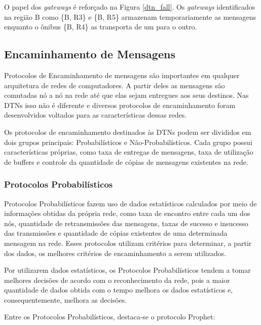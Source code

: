 O papel dos \emph{gateways} é reforçado na Figura \ref{dtn_fall}. Os \emph{gateways} identificados na região B como \{B, R3\} e \{B, R5\} armazenam temporariamente as mensagens enquanto o ônibus \{B, R4\} as transporta de um para o outro.

\subsection{Encaminhamento de Mensagens}
\label{subsec:encaminhamento_mensagens}
Protocolos de Encaminhamento de mensagens são importantes em qualquer arquitetura de redes de computadores. A partir deles as mensagens são comutadas nó a nó na rede até que elas sejam entregues aos seus destinos. Nas DTNs isso não é diferente e diversos protocolos de encaminhamento foram desenvolvidos voltados para as características dessas redes.

Os protocolos de encaminhamento destinados às DTNs podem ser divididos em dois grupos principais: Probabilísticos e Não-Probabilísticos. Cada grupo possui características próprias, como taxa de entregas de mensagens, taxa de utilização de buffers e controle da quantidade de cópias de mensagens existentes na rede.

\subsubsection{Protocolos Probabilísticos}

Protocolos Probabilísticos fazem uso de dados estatísticos calculados por meio de informações obtidas da própria rede, como taxa de encontro entre cada um dos nós, quantidade de retransmissões das mensagens, taxas de sucesso e insucesso das transmissões e quantidade de cópias existentes de uma determinada mensagem na rede. Esses protocolos utilizam critérios para determinar, a partir dos dados, os melhores critérios de encaminhamento a serem utilizados.

Por utilizarem dados estatísticos, os Protocolos Probabilísticos tendem a tomar melhores decisões de acordo com o reconhecimento da rede, pois a maior quantidade de dados obtida com o tempo melhora os dados estatísticos e, consequentemente, melhora as decisões.

Entre os Protocolos Probabilísticos, destaca-se o protocolo Prophet:


